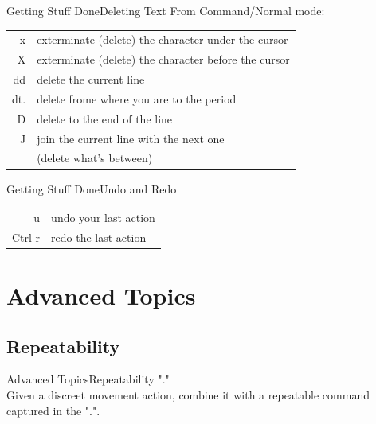 \documentclass{beamer}
\begin{document}
\begin{frame}[c]{Getting Stuff Done}{Deleting Text}
    From Command/Normal mode:
    \begin{table}[htpb]
        \centering
        \begin{tabular}{r|l}
            x    & exterminate (delete) the character under the cursor \\
            X    & exterminate (delete) the character before the cursor \\
            dd   & delete the current line \\
            dt.  & delete frome where you are to the period \\
            D    & delete to the end of the line \\
            J    & join the current line with the next one \\
                 & (delete what's between) \\
        \end{tabular}
    \end{table}
\end{frame}


\begin{frame}[c]{Getting Stuff Done}{Undo and Redo}
    \begin{table}[htpb]
        \centering
        \begin{tabular}{r|l}
            u      & undo your last action \\
            Ctrl-r & redo the last action \\
        \end{tabular}
    \end{table}
\end{frame}


\section{Advanced Topics}

\subsection{Repeatability}
\begin{frame}[c]{Advanced Topics}{Repeatability}
    \centering
    "." \\
    \vspace{1cm}
    Given a discreet movement action, combine it with a repeatable command captured in the ".".
\end{frame}
\end{document}
